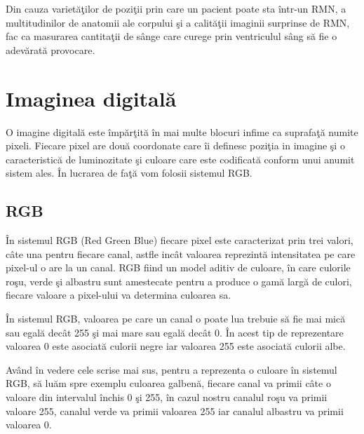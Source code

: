 \par

Din cauza variet\u{a}\c{t}ilor de pozi\c{t}ii prin care un pacient poate sta \^{i}ntr-un RMN, a multitudinilor de anatomii ale corpului \c{s}i a calit\u{a}\c{t}ii imaginii surprinse de RMN, fac ca masurarea cantita\c{t}ii de s\^{a}nge care curege prin ventriculul s\^{a}ng s\u{a} fie o adev\u{a}rat\u{a} provocare.

\section{Imaginea digital\u{a}}

O imagine digital\u{a} este \^{i}mp\u{a}r\c{t}it\u{a} \^{i}n mai multe blocuri infime ca suprafa\c{t}\u{a} numite pixeli. Fiecare pixel are dou\u{a} coordonate care \^{i}i definesc pozi\c{t}ia in imagine \c{s}i o caracteristic\u{a} de luminozitate \c{s}i culoare care este codificat\u{a} conform unui anumit sistem ales. \^{I}n lucrarea de fa\c{t}\u{a} vom folosii sistemul RGB.

\subsection{RGB}

\^{I}n sistemul RGB (Red Green Blue) fiecare pixel este caracterizat prin trei valori, c\^{a}te una pentru fiecare canal, astfle inc\^{a}t valoarea reprezint\u{a} intensitatea pe care pixel-ul o are la un canal. RGB fiind un model aditiv de culoare, \^{i}n care culorile ro\c{s}u, verde \c{s}i albastru sunt amestecate pentru a produce o gam\u{a} larg\u{a} de culori, fiecare valoare a pixel-ului va determina culoarea sa.

\par

\^{I}n sistemul RGB, valoarea pe care un canal o poate lua trebuie s\u{a} fie mai mic\u{a} sau egal\u{a} dec\^{a}t 255 \c{s}i mai mare sau egal\u{a} dec\^{a}t 0. \^{I}n acest tip de reprezentare valoarea 0 este asociat\u{a} culorii negre iar valoarea 255 este asociat\u{a} culorii albe. 

\par

Av\^{a}nd \^{i}n vedere cele scrise mai sus, pentru a reprezenta o culoare \^{i}n sistemul RGB, s\u{a} lu\u{a}m spre exemplu culoarea galben\u{a}, fiecare canal va primii c\^{a}te o valoare din intervalul \^{i}nchis 0 \c{s}i 255, \^{i}n cazul nostru canalul ro\c{s}u va primii valoare 255, canalul verde va primii valoarea 255 iar canalul albastru va primii valoarea 0.

